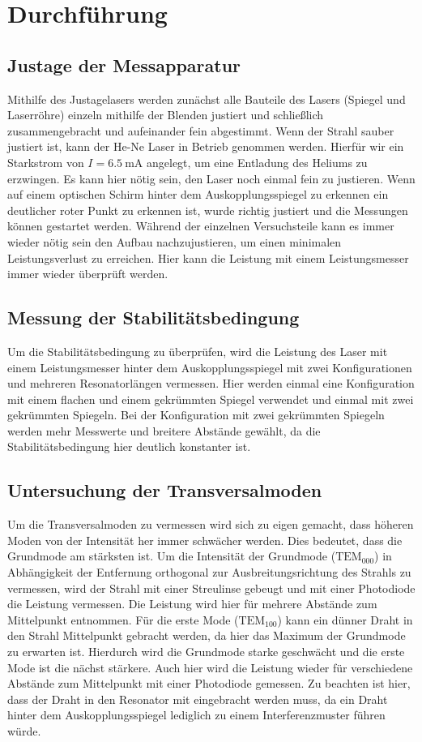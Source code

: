 \chapter{Durchführung}
\label{cha:Durchführung}

\section{Justage der Messapparatur}
Mithilfe des Justagelasers werden zunächst alle Bauteile des Lasers (Spiegel und Laserröhre) einzeln mithilfe der Blenden justiert und schließlich zusammengebracht und 
aufeinander fein abgestimmt. Wenn der Strahl sauber justiert ist, kann der He-Ne Laser in Betrieb genommen werden. Hierfür wir ein Starkstrom von $I=\qty{6.5}{\milli\ampere}$
angelegt, um eine Entladung des Heliums zu erzwingen. Es kann hier nötig sein, den Laser noch einmal fein zu justieren. Wenn auf einem optischen Schirm hinter dem Auskopplungsspiegel
zu erkennen ein deutlicher roter Punkt zu erkennen ist, wurde richtig justiert und die Messungen können gestartet werden. Während der einzelnen Versuchsteile kann es immer wieder nötig sein
den Aufbau nachzujustieren, um einen minimalen Leistungsverlust zu erreichen. Hier kann die Leistung mit einem Leistungsmesser immer wieder überprüft werden.

\section{Messung der Stabilitätsbedingung}
Um die Stabilitätsbedingung zu überprüfen, wird die Leistung des Laser mit einem Leistungsmesser hinter dem Auskopplungsspiegel mit zwei Konfigurationen und mehreren Resonatorlängen vermessen.
Hier werden einmal eine Konfiguration mit einem flachen und einem gekrümmten Spiegel verwendet und einmal mit zwei gekrümmten Spiegeln. Bei der Konfiguration mit zwei gekrümmten Spiegeln werden
mehr Messwerte und breitere Abstände gewählt, da die Stabilitätsbedingung hier deutlich konstanter ist.

\section{Untersuchung der Transversalmoden}
Um die Transversalmoden zu vermessen wird sich zu eigen gemacht, dass höheren Moden von der Intensität her immer schwächer werden. Dies bedeutet, dass die Grundmode am stärksten ist. Um die Intensität der
Grundmode ($\mathrm{TEM}_{000}$) in Abhängigkeit der Entfernung orthogonal zur Ausbreitungsrichtung des Strahls zu vermessen, wird der Strahl mit einer Streulinse gebeugt und mit einer Photodiode die Leistung vermessen. Die Leistung
wird hier für mehrere Abstände zum Mittelpunkt entnommen. Für die erste Mode ($\mathrm{TEM}_{100}$) kann ein dünner Draht in den Strahl Mittelpunkt gebracht werden, da hier das Maximum der Grundmode zu erwarten ist. Hierdurch wird die Grundmode starke geschwächt
und die erste Mode ist die nächst stärkere. Auch hier wird die Leistung wieder für verschiedene Abstände zum Mittelpunkt mit einer Photodiode gemessen. Zu beachten ist hier, dass der Draht in den Resonator mit eingebracht werden muss,
da ein Draht hinter dem Auskopplungsspiegel lediglich zu einem Interferenzmuster führen würde.

